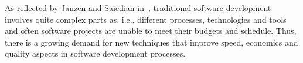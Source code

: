 As reflected by Janzen and Saiedian in~\cite{janzen2}, traditional software development involves quite complex parts as. i.e., different processes, technologies and tools and often software projects are unable to meet their budgets and schedule. Thus, there is a growing demand for new techniques that improve speed, economics and quality aspects in software development processes. 